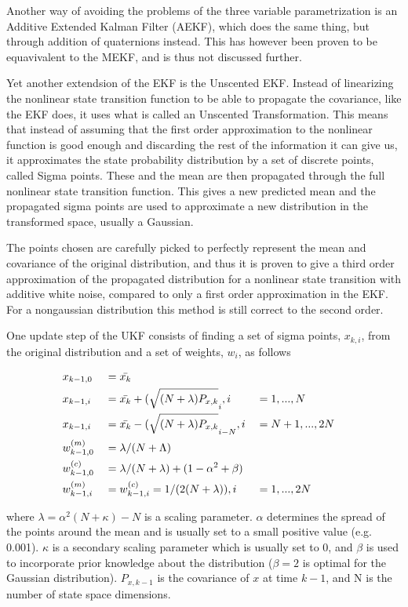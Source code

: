 Another way of avoiding the problems of the three variable parametrization is an Additive Extended Kalman Filter (AEKF), which does the same thing, but through addition of quaternions instead. This has however been proven to be equavivalent to the MEKF\cite{AEKF}, and is thus not discussed further.

Yet another extendsion of the EKF is the Unscented EKF\cite{UKF}. Instead of linearizing the nonlinear state transition function to be able to propagate the covariance, like the EKF does, it uses what is called an Unscented Transformation\cite{UTrans}. This means that instead of assuming that the first order approximation to the nonlinear function is good enough and discarding the rest of the information it can give us, it approximates the state probability distribution by a set of discrete points, called Sigma points. These and the mean are then propagated through the full nonlinear state transition function. This gives a new predicted mean and the propagated sigma points are used to approximate a new distribution in the transformed space, usually a Gaussian. 

The points chosen are carefully picked to perfectly represent the mean and covariance of the original distribution, and thus it is proven to give a third order approximation of the propagated distribution for a nonlinear state transition with additive white noise, compared to only a first order approximation in the EKF. For a nongaussian distribution this method is still correct to the second order.

One update step of the UKF consists of finding a set of sigma points, $x_{k,i}$, from the original distribution and a set of weights, $w_i$, as follows

\begin{alignat*}{3}
    & x_{k-1,0} &&= \Bar{x_k} \\
    & x_{k-1,i} &&= \Bar{x_k} + (\sqrt{(N+\lambda)P_{x,k}}_i, i &&= 1,...,N \\
    & x_{k-1,i} &&= \Bar{x_k} - (\sqrt{(N+\lambda)P_{x,k}}_{i-N}, i &&=N + 1,...,2N \\
    & w_{k-1,0}^{(m)} &&= \lambda/(N+\Lambda) \\ 
    & w_{k-1,0}^{(c)} &&= \lambda/(N+\lambda) + (1-\alpha^2 + \beta) \\
    & w_{k-1,i}^{(m)} &&= w_{k-1,i}^{(c)} = 1/(2(N+\lambda)), i &&= 1,...,2N
\end{alignat*}

where $\lambda = \alpha^2(N+\kappa) - N$ is a scaling parameter. $\alpha$ determines the spread of the points around the mean and is usually set to a small positive value (e.g. 0.001). $\kappa$ is a secondary scaling parameter which is usually set to 0, and $\beta$ is used to incorporate prior knowledge about the distribution ($\beta=2$ is optimal for the Gaussian distribution). $P_{x,k-1}$ is the covariance of $x$ at time $k-1$, and N is the number of state space dimensions. 

